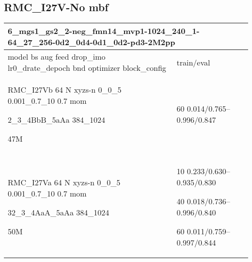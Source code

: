 \documentclass[,table,dvipsnames]{article}
\begin{document}
\subsection{RMC\_I27V-No mbf}
\noindent\begin{tabular}{|p{10cm}|p{5cm}| }	
	\hline
	\multicolumn{2}{|p{15cm}|}{ 6\_mgs1\_gs2\_2-neg\_fmn14\_mvp1-1024\_240\_1-64\_27\_256-0d2\_0d4-0d1\_0d2-pd3-2M2pp }\\
	\hline
	model bs aug feed drop\_imo lr0\_drate\_depoch bnd optimizer block\_config & train/eval \\
	
	\rowcolor{red!20}
	RMC\_I27Vb 64 N xyzs-n 0\_0\_5 0.001\_0.7\_10 0.7 mom\par 2\_3\_4BbB\_5aAa 384\_1024\par 47M& 60 0.014/0.765--0.996/0.847\\
	
	\rowcolor{blue!20}\\
	RMC\_I27Va 64 N xyzs-n 0\_0\_5 0.001\_0.7\_10 0.7 mom\par 32\_3\_4AaA\_5aAa 384\_1024\par 50M & 10 0.233/0.630--0.935/0.830\par 40 0.018/0.736--0.996/0.840\par 60 0.011/0.759--0.997/0.844\\
	
	\hline 
\end{tabular}
\end{document}
